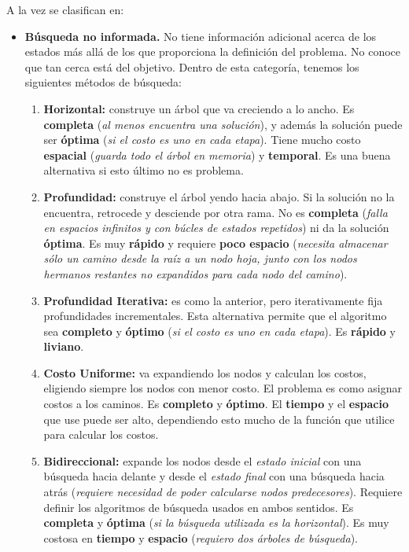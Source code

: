 \documentclass[10pt,a4paper]{article}
\begin{document}
A la vez se clasifican en:
\begin{itemize}
\item \textbf{Búsqueda no informada.} No tiene información adicional acerca de los estados más allá de los que proporciona la definición del problema. No conoce que tan cerca está del objetivo. Dentro de esta categoría, tenemos los siguientes métodos de búsqueda:
\begin{enumerate}
\item \textbf{Horizontal:} construye un árbol que va creciendo a lo ancho. Es \textbf{completa} (\textit{al menos encuentra una solución}), y además la solución puede ser \textbf{óptima} (\textit{si el costo es uno en cada etapa}). Tiene mucho costo \textbf{espacial} (\textit{guarda todo el árbol en memoria}) y \textbf{temporal}. Es una buena alternativa si esto último no es problema.
\item \textbf{Profundidad:} construye el árbol yendo hacia abajo. Si la solución no la encuentra, retrocede y desciende por otra rama. No es \textbf{completa} (\textit{falla en espacios infinitos y con búcles de estados repetidos}) ni da la solución \textbf{óptima}. Es muy \textbf{rápido} y requiere \textbf{poco espacio} (\textit{necesita almacenar sólo un camino desde la raíz a un nodo hoja, junto con los nodos hermanos restantes no expandidos para cada nodo del camino}).
\item \textbf{Profundidad Iterativa:} es como la anterior, pero iterativamente fija profundidades incrementales. Esta alternativa permite que el algoritmo sea \textbf{completo} y \textbf{óptimo} (\textit{si el costo es uno en cada etapa}). Es \textbf{rápido} y \textbf{liviano}.
\item \textbf{Costo Uniforme:} va expandiendo los nodos y calculan los costos, eligiendo siempre los nodos con menor costo. El problema es como asignar costos a los caminos. Es \textbf{completo} y \textbf{óptimo}. El \textbf{tiempo} y el \textbf{espacio} que use puede ser alto, dependiendo esto mucho de la función que utilice para calcular los costos.
\item \textbf{Bidireccional:} expande los nodos desde el \textit{estado inicial} con una búsqueda hacia delante y desde el \textit{estado final} con una búsqueda hacia atrás (\textit{requiere necesidad de poder calcularse nodos predecesores}). Requiere definir los algoritmos de búsqueda usados en ambos sentidos. Es \textbf{completa} y \textbf{óptima} (\textit{si la búsqueda utilizada es la horizontal}). Es muy costosa en \textbf{tiempo} y \textbf{espacio} (\textit{requiero dos árboles de búsqueda}).

\end{enumerate}
\end{itemize}
\end{document}

